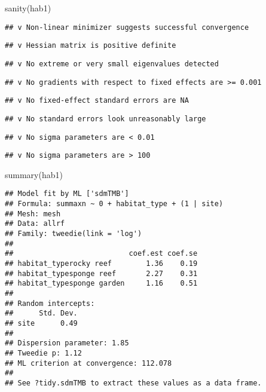 \documentclass[
]{article}
\newenvironment{Shaded}{\begin{snugshade}}{\end{snugshade}}
\newcommand{\FunctionTok}[1]{\textcolor[rgb]{0.00,0.00,0.00}{#1}}
\newcommand{\NormalTok}[1]{#1}
\begin{document}
\begin{Shaded}
\begin{Highlighting}[]
\FunctionTok{sanity}\NormalTok{(hab1)}
\end{Highlighting}
\end{Shaded}

\begin{verbatim}
## v Non-linear minimizer suggests successful convergence
\end{verbatim}

\begin{verbatim}
## v Hessian matrix is positive definite
\end{verbatim}

\begin{verbatim}
## v No extreme or very small eigenvalues detected
\end{verbatim}

\begin{verbatim}
## v No gradients with respect to fixed effects are >= 0.001
\end{verbatim}

\begin{verbatim}
## v No fixed-effect standard errors are NA
\end{verbatim}

\begin{verbatim}
## v No standard errors look unreasonably large
\end{verbatim}

\begin{verbatim}
## v No sigma parameters are < 0.01
\end{verbatim}

\begin{verbatim}
## v No sigma parameters are > 100
\end{verbatim}

\begin{Shaded}
\begin{Highlighting}[]
\FunctionTok{summary}\NormalTok{(hab1)}
\end{Highlighting}
\end{Shaded}

\begin{verbatim}
## Model fit by ML ['sdmTMB']
## Formula: summaxn ~ 0 + habitat_type + (1 | site)
## Mesh: mesh
## Data: allrf
## Family: tweedie(link = 'log')
##  
##                           coef.est coef.se
## habitat_typerocky reef        1.36    0.19
## habitat_typesponge reef       2.27    0.31
## habitat_typesponge garden     1.16    0.51
## 
## Random intercepts:
##      Std. Dev.
## site      0.49
## 
## Dispersion parameter: 1.85
## Tweedie p: 1.12
## ML criterion at convergence: 112.078
## 
## See ?tidy.sdmTMB to extract these values as a data frame.
\end{verbatim}
\end{document}
